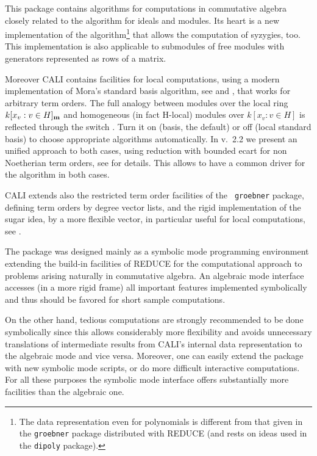 This package contains algorithms for computations in commutative
algebra closely related to the \gr algorithm for ideals and modules.
Its heart is a new implementation of the \gr algorithm\footnote{The
data representation even for polynomials is different from that given
in the {\tt groebner} package distributed with REDUCE (and rests on ideas
used in the {\tt dipoly} package).} that allows the computation of
syzygies, too. This implementation is also applicable to submodules of
free modules with generators represented as rows of a matrix.

Moreover CALI contains facilities for local computations, using a
modern implementation of Mora's standard basis algorithm, see
\cite{MPT} and \cite{tcah}, that works for arbitrary term orders.
The full analogy between modules over the local ring \linebreak[1]
$k[x_v:v\in H]_{\bf m}$ and homogeneous (in fact H-local) modules
over $k[x_v:v\in H]$ is reflected through the switch
.  Turn it on (\gr basis, the default) or off (local
standard basis) to choose appropriate algorithms
automatically. In v.\ 2.2 we present an unified approach to both
cases, using reduction with bounded ecart for non Noetherian term
orders, see \cite{ala} for details. This allows to have a common
driver for the \gr algorithm in both cases.

CALI extends also the restricted term order facilities of the {\tt
groebner} package, defining term orders by degree vector lists, and
the rigid implementation of the sugar idea, by a more flexible
 vector, in particular useful for local computations, see
\cite{tcah}.
\medskip

The package was designed mainly as a symbolic mode programming
environment extending the build-in facilities of REDUCE for the
computational approach to problems arising naturally in commutative
algebra. An algebraic mode interface accesses (in a more rigid frame)
all important features implemented symbolically and thus
should be favored for short sample computations.

On the other hand, tedious computations are strongly recommended to
be done symbolically since this allows considerably more flexibility
and avoids unnecessary translations of intermediate results from
CALI's internal data representation to the algebraic mode and vice
versa. Moreover, one can easily extend the package with new symbolic
mode scripts, or do more difficult interactive computations. For all
these purposes the symbolic mode interface offers substantially more
facilities than the algebraic one.
\medskip

